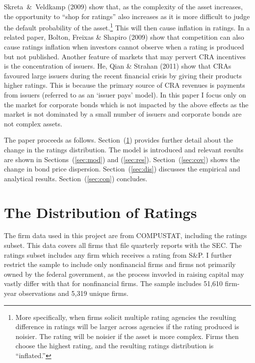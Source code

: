\documentclass[notitlepage]{article}
\begin{document}
Skreta~\&~Veldkamp (2009) show that, as the complexity of the asset increases, the opportunity to ``shop for ratings'' also increases as it is more difficult to judge the default probability of the asset.\footnote{More specifically, when firms solicit multiple rating agencies the resulting difference in ratings will be larger across agencies if the rating produced is noisier. The rating will be noisier if the asset is more complex. Firms then choose the highest rating, and the resulting ratings distribution is ``inflated.''} This will then cause inflation in ratings. In a related paper, Bolton, Freixas \& Shapiro (2009) show that competition can also cause ratings inflation when investors cannot observe when a rating is produced but not published. Another feature of markets that may pervert CRA incentives is the concentration of issuers. He, Qian \& Strahan (2011) show that CRAs favoured large issuers during the recent financial crisis by giving their products higher ratings. This is because the primary source of CRA revenues is payments from issuers (referred to as an `issuer pays' model). In this paper I focus only on the market for corporate bonds which is not impacted by the above effects as the market is not dominated by a small number of issuers and corporate bonds are not complex assets. 

The paper proceeds as follows. Section~(\ref{sec:rat}) provides further detail about the change in the ratings distribution. The model is introduced and relevant results are shown in Sections~(\ref{sec:mod}) and (\ref{sec:res}). Section~(\ref{sec:cov}) shows the change in bond price dispersion. Section~(\ref{sec:dis}) discusses the empirical and analytical results. Section~(\ref{sec:con}) concludes.

\section{The Distribution of Ratings}
\label{sec:rat}
The firm data used in this project are from COMPUSTAT, including the ratings subset. This data covers all firms that file quarterly reports with the SEC. The ratings subset includes any firm which receives a rating from S\&P. I further restrict the sample to include only nonfinancial firms and firms not primarily owned by the federal government, as the process invovled in raising capital may vastly differ with that for nonfinancial firms. The sample includes 51,610 firm-year observations and 5,319 unique firms. 
\end{document}

